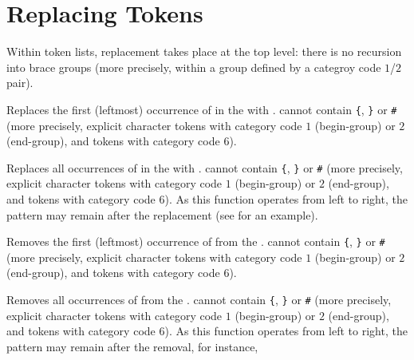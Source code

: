 \documentclass[oneside]{book}
\begin{document}
\section{Replacing Tokens}

Within token lists, replacement takes place at the top level: there is
no recursion into brace groups (more precisely, within a group defined by
a categroy code $1$/$2$ pair).

\begin{function}{\TlVarReplaceOnce}
\begin{syntax}
   
\end{syntax}
Replaces the first (leftmost) occurrence of  in the
 with . 
cannot contain \verb|{|, \verb|}| or \verb|#|
(more precisely, explicit character tokens with category code $1$
(begin-group) or $2$ (end-group), and tokens with category code $6$).
\end{function}

\begin{function}{\TlVarReplaceAll}
\begin{syntax}
   
\end{syntax}
Replaces all occurrences of  in the
 with . 
cannot contain \verb|{|, \verb|}| or \verb|#|
(more precisely, explicit character tokens with category code $1$
(begin-group) or $2$ (end-group), and tokens with category code $6$).
As this function
operates from left to right, the pattern 
may remain after the replacement (see 
for an example).
\end{function}

\begin{function}{\TlVarRemoveOnce}
\begin{syntax}
  
\end{syntax}
Removes the first (leftmost) occurrence of  from the
.  cannot contain \verb|{|, \verb|}| or \verb|#|
(more precisely, explicit character tokens with category code $1$
(begin-group) or $2$ (end-group), and tokens with category code $6$).
\end{function}

\begin{function}{\TlVarRemoveAll}
\begin{syntax}
  
\end{syntax}
Removes all occurrences of  from the
.  cannot contain \verb|{|, \verb|}| or \verb|#|
(more precisely, explicit character tokens with category code $1$
(begin-group) or $2$ (end-group), and tokens with category code $6$).
As this function
operates from left to right, the pattern 
may remain after the removal, for instance,
\begin{demohigh}
\TlSet {}
\TlVarRemoveAll {}
\TlUse \lTmpaTl
\end{demohigh}
\end{function}
\end{document}
